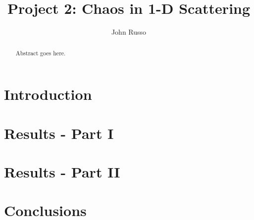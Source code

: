 \documentclass[pra,twocolumn,showpacs,amsmath,amssymb]{revtex4-1}
\begin{document}
\title{Project 2: Chaos in 1-D Scattering}


\author{John Russo}

\begin{abstract}
Abstract goes here.
\end{abstract}

\pacs{}


\maketitle

\section{Introduction} \label{sec:intro}


\section{Results - Part I}


\section{Results - Part II}

\section{Conclusions} \label{sec:conclusion}

\begin{thebibliography}{1}

\end{thebibliography}
\end{document}
